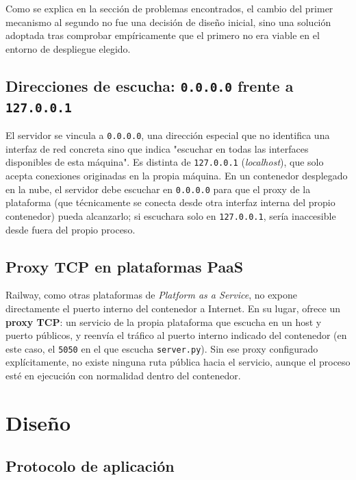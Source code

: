\documentclass[12pt,a4paper]{article}
\begin{document}
Como se explica en la sección de problemas encontrados, el cambio del primer mecanismo al segundo no fue una decisión de diseño inicial, sino una solución adoptada tras comprobar empíricamente que el primero no era viable en el entorno de despliegue elegido.

\subsection{Direcciones de escucha: \texttt{0.0.0.0} frente a \texttt{127.0.0.1}}

El servidor se vincula a \texttt{0.0.0.0}, una dirección especial que no identifica una interfaz de red concreta sino que indica "escuchar en todas las interfaces disponibles de esta máquina". Es distinta de \texttt{127.0.0.1} (\textit{localhost}), que solo acepta conexiones originadas en la propia máquina. En un contenedor desplegado en la nube, el servidor debe escuchar en \texttt{0.0.0.0} para que el proxy de la plataforma (que técnicamente se conecta desde otra interfaz interna del propio contenedor) pueda alcanzarlo; si escuchara solo en \texttt{127.0.0.1}, sería inaccesible desde fuera del propio proceso.

\subsection{Proxy TCP en plataformas PaaS}

Railway, como otras plataformas de \textit{Platform as a Service}, no expone directamente el puerto interno del contenedor a Internet. En su lugar, ofrece un \textbf{proxy TCP}: un servicio de la propia plataforma que escucha en un host y puerto públicos, y reenvía el tráfico al puerto interno indicado del contenedor (en este caso, el \texttt{5050} en el que escucha \texttt{server.py}). Sin ese proxy configurado explícitamente, no existe ninguna ruta pública hacia el servicio, aunque el proceso esté en ejecución con normalidad dentro del contenedor.


\section{Diseño}

\subsection{Protocolo de aplicación}
\end{document}
